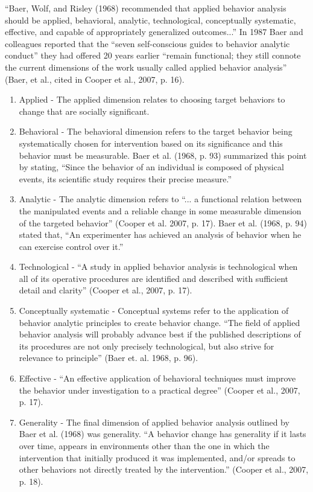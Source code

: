 ``Baer, Wolf, and Risley (1968) recommended that applied behavior analysis should be applied, behavioral, analytic, technological, conceptually systematic, effective, and capable of appropriately generalized outcomes...'' In 1987 Baer and colleagues reported that the ``seven self-conscious guides to behavior analytic conduct'' they had offered 20 years earlier ``remain functional; they still connote the current dimensions of the work usually called applied behavior analysis'' (Baer, et al., cited in Cooper et al., 2007, p. 16).
\begin{enumerate}
\item Applied - The applied dimension relates to choosing target behaviors to change that are socially significant. 
\item Behavioral - The behavioral dimension refers to the target behavior being systematically chosen for intervention based on its significance and this behavior must be measurable.  Baer et al. (1968, p. 93) summarized this point by stating, ``Since the behavior of an individual is composed of physical events, its scientific study requires their precise measure.''
\item Analytic - The analytic dimension refers to ``... a functional relation between the manipulated events and a reliable change in some measurable dimension of the targeted behavior'' (Cooper et al. 2007, p. 17). Baer et al. (1968, p. 94) stated that, ``An experimenter has achieved an analysis of behavior when he can exercise control over it.''
\item Technological - ``A study in applied behavior analysis is technological when all of its operative procedures are identified and described with sufficient detail and clarity'' (Cooper et al., 2007, p. 17).
\item Conceptually systematic - Conceptual systems refer to the application of behavior analytic principles to create behavior change. ``The field of applied behavior analysis will probably advance best if the published descriptions of its procedures are not only precisely technological, but also strive for relevance to principle'' (Baer et. al. 1968, p. 96).
\item Effective - ``An effective application of behavioral techniques must improve the behavior under investigation to a practical degree'' (Cooper et al., 2007, p. 17).
\item Generality - The final dimension of applied behavior analysis outlined by Baer et al. (1968) was generality. ``A behavior change has generality if it lasts over time, appears in environments other than the one in which the intervention that initially produced it was implemented, and/or spreads to other behaviors not directly treated by the intervention.'' (Cooper et al., 2007, p. 18).
\end{enumerate}

